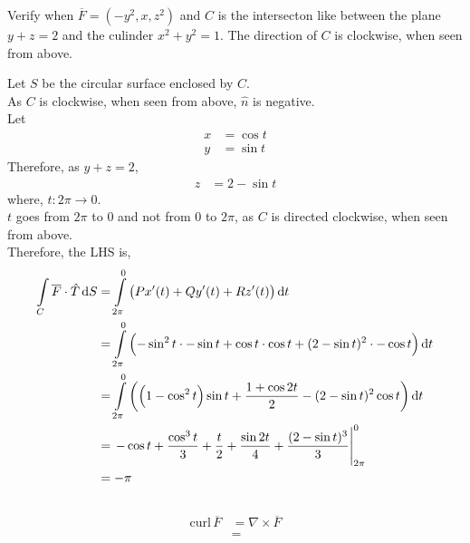 \documentclass[fleqn, a4paper, 8pt, twoside]{amsart}
\theoremstyle{definition}
\theoremstyle{bluedefinition}
\theoremstyle{redtheorem}
\newcommand{\curl}{\mathrm{curl\,}}
\begin{document}
\begin{multicols}{2}
\begin{spacing}{0.7}
\begin{question}
	Verify  when $\overline{F} = \left( -y^2 , x , z^2 \right)$ and $C$ is the intersecton like between the plane $y + z = 2$ and the culinder $x^2 + y^2 = 1$.
	The direction of $C$ is clockwise, when seen from above.
\end{question}

\begin{solution}
	Let $S$ be the circular surface enclosed by $C$.\\
	As $C$ is clockwise, when seen from above, $\hat{n}$ is negative.\\
	Let
	\begin{align*}
		x & = \cos t \\
		y & = \sin t
	\end{align*}
	Therefore, as $y + z = 2$,
	\begin{align*}
		z & = 2 - \sin t
	\end{align*}
	where, $t : 2 \pi \to 0$.\\
	$t$ goes from $2 \pi$ to $0$ and not from $0$ to $2 \pi$, as $C$ is directed clockwise, when seen from above.\\
	Therefore, the LHS is,
	\begin{align*}
		\int\limits_{C} \overline{F} \cdot \hat{T} \dif S & = \int\limits_{2 \pi}^{0} \left( P x'(t) + Q y'(t) + R z'(t) \right) \dif t                                                         \\
                                                                  & = \int\limits_{2 \pi}^{0} \left( -\sin^2 t \cdot -\sin t + \cos t \cdot \cos t + (2 - \sin t)^2 \cdot -\cos t \right) \dif t        \\
                                                                  & = \int\limits_{2 \pi}^{0} \left( \left( 1 - \cos^2 t \right) \sin t + \frac{1 + \cos 2 t}{2} - (2 - \sin t)^2 \cos t \right) \dif t \\
                                                                  & = \left. -\cos t + \frac{\cos^3 t}{3} + \frac{t}{2} + \frac{\sin 2 t}{4} + \frac{(2 - \sin t)^3}{3} \right|_{2 \pi}^{0}             \\
                                                                  & = -\pi
	\end{align*}
	~\\
	\begin{align*}
		\curl \overline{F} &= \nabla \times \overline{F}\\
		                   &=

\end{align*}
\end{solution}
\end{spacing}
\end{multicols}
\end{document}
